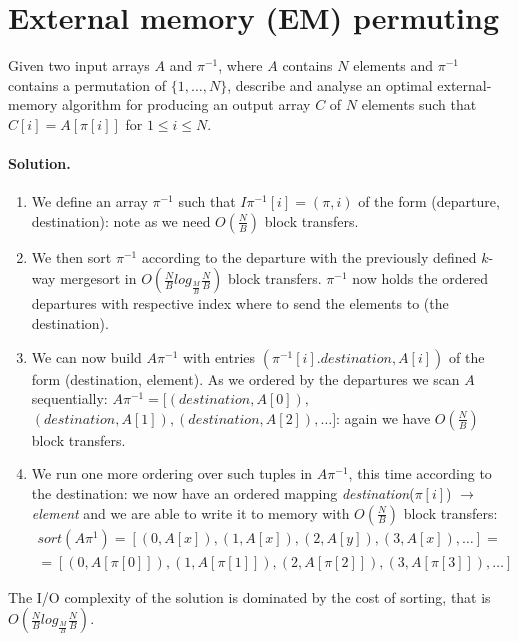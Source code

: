 \section{External memory (EM) permuting}
Given two input arrays $A$ and $\pi^{-1}$, where $A$ contains $N$ elements and $\pi^{-1}$ contains a permutation of $\{1, \dots, N\}$, describe and analyse an optimal external-memory algorithm for producing an output array $C$ of $N$ elements such that $C[i] = A[\pi[i]]$ for $1 \leq i \leq N$.

\vspace{0.5cm}
\paragraph{Solution.}
\begin{enumerate}
	\item We define an array $\pi^{-1}$ such that $I\pi^{-1}[i] = (\pi, i)$ of the form (departure, destination): note as we need $O(\frac{N}{B})$ block transfers.
	\item We then sort $\pi^{-1}$ according to the departure with the previously defined $k$-way mergesort in $O(\frac{N}{B} log_{\frac{M}{B}} \frac{N}{B})$ block transfers. $\pi^{-1}$ now holds the ordered departures with respective index where to send the elements to (the destination).
	\item We can now build $A\pi^{-1}$ with entries $(\pi^{-1}[i].destination, A[i])$ of the form (destination, element).
	As we ordered by the departures we scan $A$ sequentially: $A\pi^{-1} = [(destination, A[0]),$ \\$(destination, A[1]), (destination, A[2]), \dots]$: again we have $O(\frac{N}{B})$ block transfers.
	\item We run one more ordering over such tuples in $A\pi^{-1}$, this time according to the destination: we now have an ordered mapping \emph{destination}($\pi[i]$) $\to$ \emph{element} and we are able to write it to memory with $O(\frac{N}{B})$ block transfers:
	\begin{gather*}
	  sort(A\pi^{1}) = [(0, A[x]), (1, A[x]), (2, A[y]), (3, A[x]), \dots ] = \\
	  = [(0, A[\pi[0]]), (1, A[\pi[1]]), (2, A[\pi[2]]), (3, A[\pi[3]]), \dots ] 
	\end{gather*}
\end{enumerate}
The I/O complexity of the solution is dominated by the cost of sorting, that is $O(\frac{N}{B} log_{\frac{M}{B}} \frac{N}{B})$.